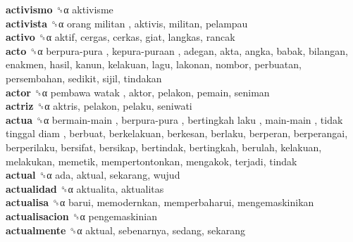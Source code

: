 \textbf{activismo} ␝α  aktivisme  \\
\textbf{activista} ␝α   orang militan , aktivis, militan, pelampau  \\
\textbf{activo} ␝α  aktif, cergas, cerkas, giat, langkas, rancak  \\
\textbf{acto} ␝α   berpura-pura ,  kepura-puraan , adegan, akta, angka, babak, bilangan, enakmen, hasil, kanun, kelakuan, lagu, lakonan, nombor, perbuatan, persembahan, sedikit, sijil, tindakan  \\
\textbf{actor} ␝α   pembawa watak , aktor, pelakon, pemain, seniman  \\
\textbf{actriz} ␝α  aktris, pelakon, pelaku, seniwati  \\
\textbf{actua} ␝α   bermain-main ,  berpura-pura ,  bertingkah laku ,  main-main ,  tidak tinggal diam , berbuat, berkelakuan, berkesan, berlaku, berperan, berperangai, berperilaku, bersifat, bersikap, bertindak, bertingkah, berulah, kelakuan, melakukan, memetik, mempertontonkan, mengakok, terjadi, tindak  \\
\textbf{actual} ␝α  ada, aktual, sekarang, wujud  \\
\textbf{actualidad} ␝α  aktualita, aktualitas  \\
\textbf{actualisa} ␝α  barui, memodernkan, memperbaharui, mengemaskinikan  \\
\textbf{actualisacion} ␝α  pengemaskinian  \\
\textbf{actualmente} ␝α  aktual, sebenarnya, sedang, sekarang  \\
